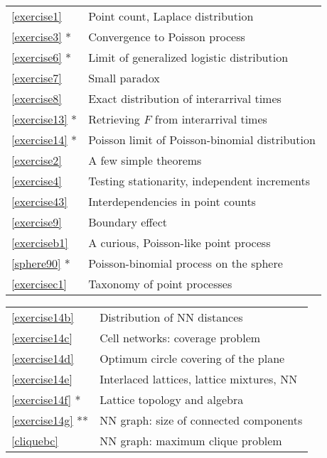 \documentclass[10pt]{article}
\begin{document}
\begin{table}[H]
    \begin{minipage}{.5\linewidth}
      \centering
        \begin{tabular}{ll}
   \ref{exercise1} & Point count, Laplace distribution   \\
   \ref{exercise3} * & Convergence to Poisson process   \\
   \ref{exercise6} * & Limit of generalized logistic distribution\\ 
   \ref{exercise7} & Small paradox \\
   \ref{exercise8} & Exact distribution of interarrival times \\
   \ref{exercise13} * & Retrieving $F$ from interarrival times\\
   \ref{exercise14} * & Poisson limit of Poisson-binomial distribution\\
   \ref{exercise2} &  A few simple theorems  \\
   \ref{exercise4}  & Testing stationarity, independent increments  \\
   \ref{exercise43}  & Interdependencies in point counts \\
   \ref{exercise9} & Boundary effect \\
   \ref{exerciseb1} & A curious, Poisson-like point process \\
   \ref{sphere90} * & Poisson-binomial process on the sphere \\
   \ref{exercisec1} & Taxonomy of point processes 
        \end{tabular}
    \end{minipage}%
    \begin{minipage}{.5\linewidth}
      \centering
        \begin{tabular}{ll}
   \ref{exercise14b} & Distribution of NN distances \\
   \ref{exercise14c} & Cell networks: coverage problem \\
   \ref{exercise14d} & Optimum circle covering of the plane \\
   \ref{exercise14e} & Interlaced lattices, lattice mixtures, NN\\
   \ref{exercise14f} * & Lattice topology and algebra\\
   \ref{exercise14g} ** & NN graph: size of connected components\\
   \ref{cliquebc} & NN graph: maximum clique problem\\

\end{tabular}
\end{minipage}
\end{table}
\end{document}
